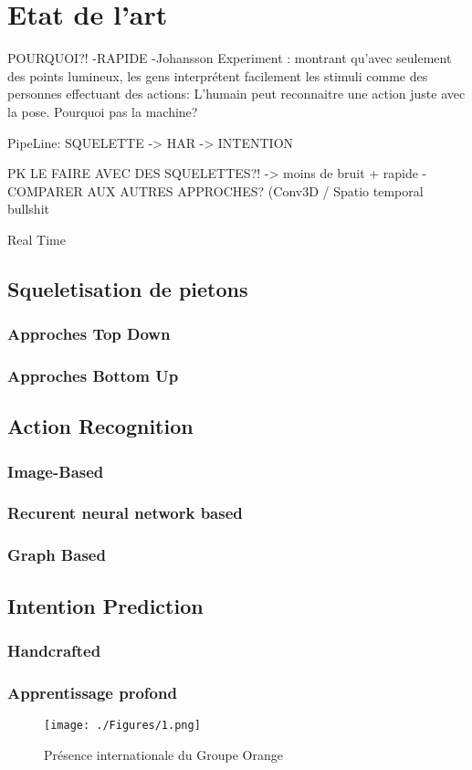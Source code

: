 \section{Etat de l'art}
\label{sec:SOTA}

POURQUOI?!
-RAPIDE
-Johansson Experiment \cite{johansson1973visual,johansson1976spatio}: montrant qu'avec seulement des points lumineux, les gens interprétent facilement les stimuli comme des personnes effectuant des actions: L'humain peut reconnaitre une action juste avec la pose. Pourquoi pas la machine?

PipeLine: SQUELETTE -> HAR -> INTENTION

PK LE FAIRE AVEC DES SQUELETTES?! -> moins de bruit + rapide
-COMPARER AUX AUTRES APPROCHES? (Conv3D / Spatio temporal bullshit

Real Time

\subsection{Squeletisation de pietons}

\label{subsec:SQUEL}
\subsubsection{Approches Top Down}
\subsubsection{Approches Bottom Up}

\subsection{Action Recognition}
\label{subsec:HAR}

\subsubsection{Image-Based}
\subsubsection{Recurent neural network based}
\subsubsection{Graph Based}

\subsection{Intention Prediction}
\subsubsection{Handcrafted}
\subsubsection{Apprentissage profond}





\begin{figure}[htbp]
    \texttt{[image: ./Figures/1.png]}
    \caption{Présence internationale du Groupe Orange}
    \label{fig:UoC}
\end{figure}

